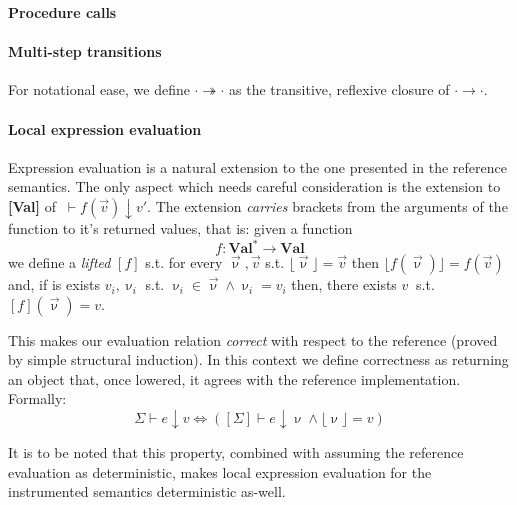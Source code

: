 \documentclass[12pt,a4paper,twoside]{book}
\begin{document}
\noindent\textbf{Procedure calls}
\begin{mathpar}
\end{mathpar}

\paragraph{Multi-step transitions}
For notational ease, we define $\cdot \twoheadrightarrow \cdot$ as the transitive, reflexive closure of $\cdot \rightarrow \cdot$.

\paragraph{Local expression evaluation}
Expression evaluation is a natural extension to the one presented in the reference semantics. The only aspect which needs careful consideration is the extension to \textbf{[Val]} of $~\vdash f(\vec{v}) \downarrow v'$.
The extension \emph{carries} brackets from the arguments of the function to it's returned values, that is: given a function
$$
f: \textbf{Val}^{*} \rightarrow \textbf{Val}
$$
we define a \emph{lifted} $[f]$ s.t. for every $\vec{\upnu}, \vec{v}$ s.t.
$\lfloor \vec{\upnu} \rfloor = \vec{v}$ then
$\lfloor f(\vec{\upnu}) \rfloor = f(\vec{v}) $
and, if is exists $v_i, \upnu_i$ s.t. $\upnu_i \in \vec{\upnu} \land \upnu_i = v_i$ then, there exists $v~$ s.t. $ [f](\vec{\upnu}) = v $.


This makes our evaluation relation \emph{correct} with respect to the reference (proved by simple structural induction). In this context we define correctness as returning an object that, once lowered, it agrees with the reference implementation.\\
Formally:
\begin{equation}\label{inst:loc_correct}
\Sigma \vdash e \downarrow v \Leftrightarrow ( [\Sigma] \vdash e \downarrow \upnu \land \lfloor \upnu \rfloor = v )
\end{equation}

It is to be noted that this property, combined with assuming the reference evaluation as deterministic, makes local expression evaluation for the instrumented semantics deterministic as-well.
\end{document}
